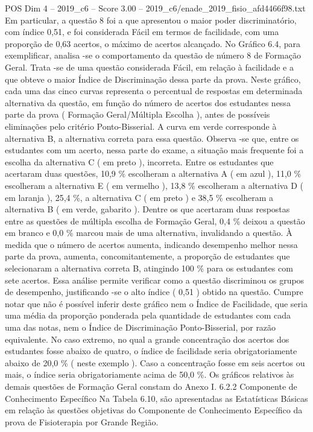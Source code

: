 \begin{textsample}{POS Dim 4 – 2019\_c6 – Score 3.00 – 2019\_c6/enade\_2019\_fisio\_afd4466f98.txt}
Em particular, a questão 8 foi a que apresentou o maior poder discriminatório, com índice 0,51, e foi considerada Fácil em termos de facilidade, com uma proporção de 0,63 acertos, o máximo de acertos alcançado.
No Gráfico 6.4, para exemplificar, analisa -se o comportamento da questão de número 8 de Formação Geral.
Trata -se de uma questão considerada Fácil, em relação à facilidade e a que obteve o maior Índice de Discriminação dessa parte da prova.
Neste gráfico, cada uma das cinco curvas representa o percentual de respostas em determinada alternativa da questão, em função do número de acertos dos estudantes nessa parte da prova ( Formação Geral/Múltipla Escolha ), antes de possíveis eliminações pelo critério Ponto-Bisserial.
A curva em verde corresponde à alternativa B, a alternativa correta para essa questão.
Observa -se que, entre os estudantes com um acerto, nessa parte do exame, a situação mais frequente foi a escolha da alternativa C ( em preto ), incorreta.
Entre os estudantes que acertaram duas questões, 10,9 \% escolheram a alternativa A ( em azul ), 11,0 \% escolheram a alternativa E ( em vermelho ), 13,8 \% escolheram a alternativa D ( em laranja ), 25,4 \%, a alternativa C ( em preto ) e 38,5 \% escolheram a alternativa B ( em verde, gabarito ).
Dentre os que acertaram duas respostas entre as questões de múltipla escolha de Formação Geral, 0,4 \% deixou a questão em branco e 0,0 \% marcou mais de uma alternativa, invalidando a questão.
À medida que o número de acertos aumenta, indicando desempenho melhor nessa parte da prova, aumenta, concomitantemente, a proporção de estudantes que selecionaram a alternativa correta B, atingindo 100 \% para os estudantes com sete acertos.
Essa análise permite verificar como a questão discriminou os grupos de desempenho, justificando -se o alto índice ( 0,51 ) obtido na questão.
Cumpre notar que não é possível inferir deste gráfico nem o Índice de Facilidade, que seria uma média da proporção ponderada pela quantidade de estudantes com cada uma das notas, nem o Índice de Discriminação Ponto-Bisserial, por razão equivalente.
No caso extremo, no qual a grande concentração dos acertos dos estudantes fosse abaixo de quatro, o índice de facilidade seria obrigatoriamente abaixo de 20,0 \% ( neste exemplo ).
Caso a concentração fosse em seis acertos ou mais, o índice seria obrigatoriamente acima de 50,0 \%.
Os gráficos relativos às demais questões de Formação Geral constam do Anexo I. 6.2.2 Componente de Conhecimento Específico Na Tabela 6.10, são apresentadas as Estatísticas Básicas em relação às questões objetivas do Componente de Conhecimento Específico da prova de Fisioterapia por Grande Região.

\end{textsample}
